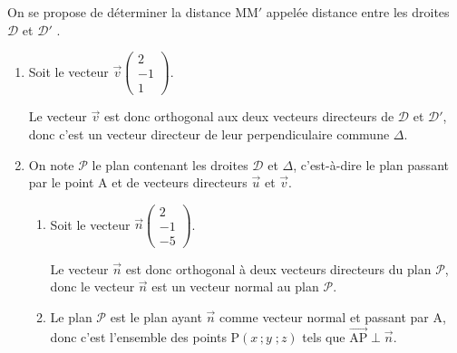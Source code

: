 \documentclass[10pt]{article}
\providecommand{\vect}[1]{\overrightarrow{#1}}
\providecommand{\vectt}[1]{\overrightarrow{\mathrm{#1}}}
\begin{document}
On se propose de déterminer la distance MM$'$ appelée \og distance entre les droites $\mathcal{D}$ et $\mathcal{D}'$ \fg.

\begin{enumerate}[resume]
\item Soit le vecteur $\vect{v}\begin{pmatrix}2\\- 1\\1\end{pmatrix}$.


Le vecteur $\vect{v}$ est donc orthogonal aux deux vecteurs directeurs de $\mathcal{D}$ et $\mathcal{D}'$, donc c'est un vecteur directeur de leur perpendiculaire commune $\Delta$.

\item On note $\mathcal{P}$ le plan contenant les droites $\mathcal{D}$ et $\Delta$, c'est-à-dire le plan passant par le point A et de vecteurs directeurs $\vect{u}$ et $\vect{v}$.
	\begin{enumerate}
		\item Soit le vecteur $\vect{n}\begin{pmatrix}2\\-1\\-5 \end{pmatrix}$.
		

Le vecteur $\vect{n}$ est donc orthogonal à deux vecteurs directeurs du plan $\mathcal{P}$, donc le vecteur $\vect{n}$ est un vecteur normal au plan $\mathcal{P}$.
		
		\item 
Le plan $\mathcal{P}$ est le plan ayant $\vect n$ comme vecteur normal et passant par A, donc c'est  l'ensemble des points P$\left (x\,; y\;;z\right )$ tels que 
$\vectt{AP} \perp \vect n$.


\end{enumerate}
\end{enumerate}
\end{document}
